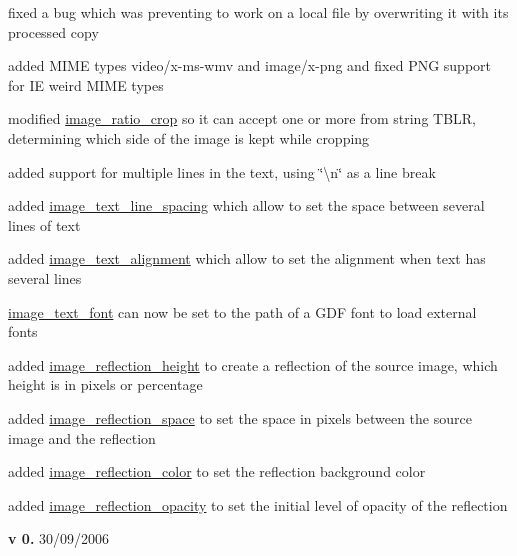 \begin{DoxyItemize}
\begin{DoxyItemize}
\item fixed a bug which was preventing to work on a local file by overwriting it with its processed copy~\newline

\item added M\+I\+M\+E types video/x-\/ms-\/wmv and image/x-\/png and fixed P\+N\+G support for I\+E weird M\+I\+M\+E types~\newline

\item modified \hyperlink{}{image\+\_\+ratio\+\_\+crop} so it can accept one or more from string \textquotesingle{}T\+B\+L\+R\textquotesingle{}, determining which side of the image is kept while cropping~\newline

\item added support for multiple lines in the text, using \char`\"{}\textbackslash{}n\char`\"{} as a line break~\newline

\item added \hyperlink{}{image\+\_\+text\+\_\+line\+\_\+spacing} which allow to set the space between several lines of text~\newline

\item added \hyperlink{}{image\+\_\+text\+\_\+alignment} which allow to set the alignment when text has several lines~\newline

\item \hyperlink{}{image\+\_\+text\+\_\+font} can now be set to the path of a G\+D\+F font to load external fonts~\newline

\item added \hyperlink{}{image\+\_\+reflection\+\_\+height} to create a reflection of the source image, which height is in pixels or percentage~\newline

\item added \hyperlink{}{image\+\_\+reflection\+\_\+space} to set the space in pixels between the source image and the reflection~\newline

\item added \hyperlink{}{image\+\_\+reflection\+\_\+color} to set the reflection background color~\newline

\item added \hyperlink{}{image\+\_\+reflection\+\_\+opacity} to set the initial level of opacity of the reflection 
\end{DoxyItemize}
\item {\bfseries v 0.} 30/09/2006~\newline


\end{DoxyItemize}
